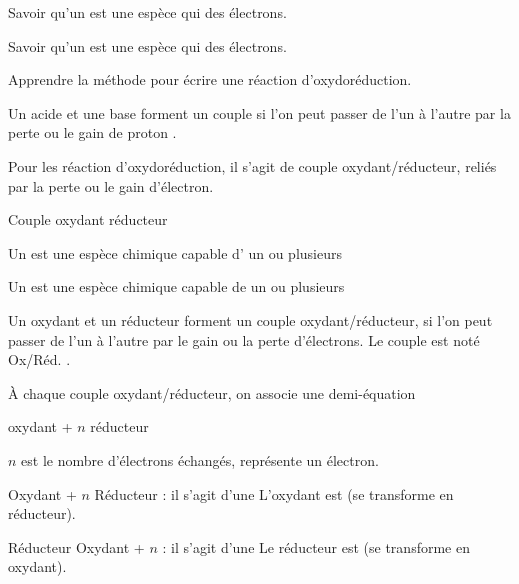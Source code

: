 \tetePremStssRedo
\vspace*{-36pt}


\begin{objectifs}
  \item Savoir qu'un  est une espèce qui  des électrons.
  \item Savoir qu'un  est une espèce qui  des électrons.
  \item Apprendre la méthode pour écrire une réaction d'oxydoréduction.
\end{objectifs}

\begin{contexte}
  Un acide et une base forment un couple si l'on peut passer de l'un à l'autre par la perte ou le gain de proton \ionHydrogene.

  Pour les réaction d'oxydoréduction, il s'agit de couple oxydant/réducteur, reliés par la perte ou le gain d'électron.
  
\end{contexte}


\begin{doc}{Couple oxydant réducteur}
  \begin{importants}  
    Un  est une espèce chimique capable d' un ou plusieurs 

    Un  est une espèce chimique capable de  un ou plusieurs 
  \end{importants}

  Un oxydant et un réducteur forment un couple oxydant/réducteur, si l'on peut passer de l'un à l'autre par le gain ou la perte d'électrons.
  Le couple est noté Ox/Réd. .

  À chaque couple oxydant/réducteur, on associe une demi-équation
  \begin{center}
    oxydant + $n$ \electron \reaction réducteur

    $n$ est le nombre d'électrons échangés, \electron représente un électron.
  \end{center}
  
  \begin{importants}
    \begin{listePoints}
      \item Oxydant + $n$ \electron \reaction Réducteur
      : il s'agit d'une 
      L'oxydant est  (se transforme en réducteur).
      \item  Réducteur \reaction Oxydant + $n$ \electron
      : il s'agit d'une 
      Le réducteur est  (se transforme en oxydant).
    \end{listePoints}
  \end{importants}
\end{doc}


